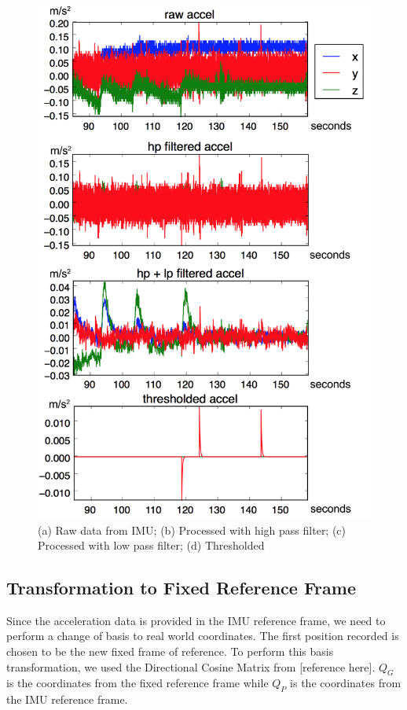 \documentclass[12pt,journal]{IEEEtran}
\begin{document}
\begin{figure}[h]
    \includegraphics[width=\linewidth]{figures/filtering}
  \caption{(a) Raw data from IMU; (b) Processed with high pass filter; (c) Processed with low pass filter; (d) Thresholded}
  \label{fig:filtering}
\end{figure}

\subsection{Transformation to Fixed Reference Frame}
  Since the acceleration data is provided in the IMU reference frame, we need to perform a change of basis to real world coordinates. The first position recorded is chosen to be the new fixed frame of reference. To perform this basis transformation, we used the Directional Cosine Matrix from [reference here]. $Q_G$ is the coordinates from the fixed reference frame while $Q_P$ is the coordinates from the IMU reference frame.
\end{document}
